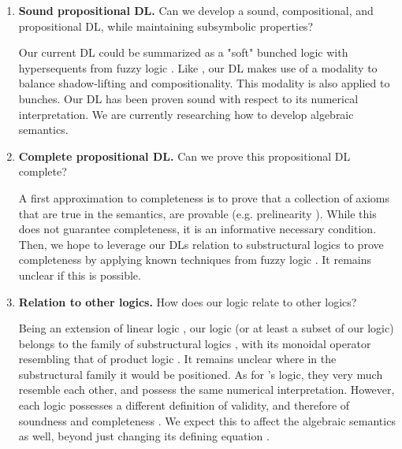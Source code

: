 \begin{enumerate}
    \item \textbf{Sound propositional DL.} Can we develop a sound, compositional, and propositional DL, while maintaining subsymbolic properties? 
    
    Our current DL could be summarized as a "soft" bunched logic \citep{o1999logic} with hypersequents from fuzzy logic \citep{prooffuzzy}. Like \citeauthor{capucci2024quantifiers}, our DL makes use of a modality to balance shadow-lifting and compositionality. This modality is also applied to bunches. Our DL has been proven sound with respect to its numerical interpretation. We are currently researching how to develop algebraic semantics.
    
    \item \textbf{Complete propositional DL.} Can we prove this propositional DL complete?
    
    A first approximation to completeness is to prove that a collection of axioms that are true in the semantics, are provable (e.g. prelinearity \citep{prooffuzzy}). While this does not guarantee completeness, it is an informative necessary condition. Then, we hope to leverage our DLs relation to substructural logics to prove completeness by applying known techniques from fuzzy logic \citep{cintula2011handbook, galatos2007residuated}. It remains unclear if this is possible. 

    
    \item \textbf{Relation to other logics.} How does our logic relate to other logics? 
    
    Being an extension of linear logic \citep{Wadler1993, agliano2025algebraic}, our logic (or at least a subset of our logic) belongs to the family of substructural logics \citep{galatos2007residuated}, with its monoidal operator resembling that of product logic \citep{cintula2011handbook, prooffuzzy}. It remains unclear where in the substructural family it would be positioned. As for \citeauthor{capucci2024quantifiers}'s logic, they very much resemble each other, and possess the same numerical interpretation. However, each logic possesses a different definition of validity, and therefore of soundness and completeness \citep{galatos2007residuated, capucci2024quantifiers}. We expect this to affect the algebraic semantics as well, beyond just changing its defining equation \citep{galatos2007residuated, agliano2025algebraic}. 
    

\end{enumerate}

